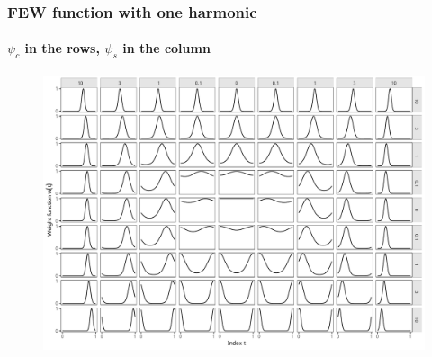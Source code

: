 \documentclass[handout]{snedecorbeamer}
\begin{document}
\begin{frame}%
  \label{frm:FEW-G1-span}
  \frametitle{FEW function with one harmonic}
  \framesubtitle{$\psi_{c}$ in the rows, $\psi_{s}$ in the column}

  \begin{figure}
    \centering
    \includegraphics[width=.65\textwidth]{FEW-G1-span}
  \end{figure}
\end{frame}
\end{document}

